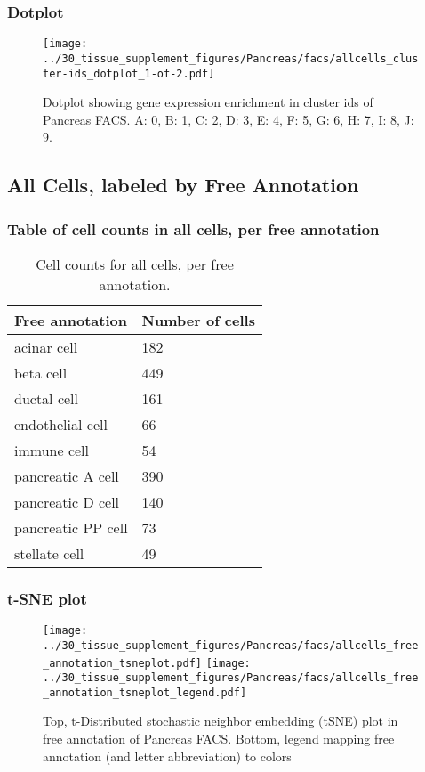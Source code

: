 \newpage
\newpage
\subsubsection{Dotplot}
\begin{figure}[h]
\centering
\texttt{[image: ../30\_tissue\_supplement\_figures/Pancreas/facs/allcells\_cluster-ids\_dotplot\_1-of-2.pdf]}

\caption{ Dotplot  showing gene expression enrichment in cluster ids of Pancreas FACS. A: 0, B: 1, C: 2, D: 3, E: 4, F: 5, G: 6, H: 7, I: 8, J: 9.}
\end{figure}


\newpage
\subsection{All Cells, labeled by Free Annotation}
\subsubsection{Table of cell counts in all cells, per free annotation}\begin{table}[h]
\centering
\label{my-label}
\begin{tabular}{@{}ll@{}}
\toprule

Free annotation& Number of cells \\ \midrule
acinar cell & 182 \\

beta cell & 449 \\

ductal cell & 161 \\

endothelial cell & 66 \\

immune cell & 54 \\

pancreatic A cell & 390 \\

pancreatic D cell & 140 \\

pancreatic PP cell & 73 \\

stellate cell & 49 \\
\bottomrule
\end{tabular}
\caption{Cell counts for all cells, per free annotation.}
\end{table}

\newpage
\subsubsection{t-SNE plot}
\begin{figure}[h]
\centering
\texttt{[image: ../30\_tissue\_supplement\_figures/Pancreas/facs/allcells\_free\_annotation\_tsneplot.pdf]}
\texttt{[image: ../30\_tissue\_supplement\_figures/Pancreas/facs/allcells\_free\_annotation\_tsneplot\_legend.pdf]}
\caption{Top, t-Distributed stochastic neighbor embedding (tSNE) plot  in free annotation of Pancreas FACS. Bottom, legend mapping free annotation (and letter abbreviation) to colors}
\end{figure}


